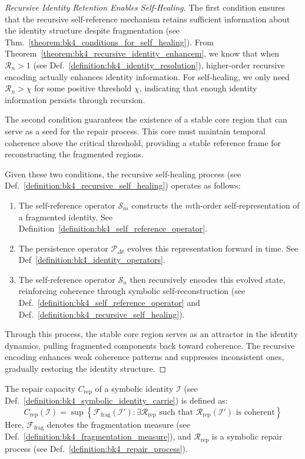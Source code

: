 \begin{proof}[Recursive Identity Retention Enables Self-Healing]
\label{proof:bk4_recursive_self_healing_threshold}
The first condition ensures that the recursive self-reference mechanism retains sufficient information about the identity structure despite fragmentation (see Thm.~\ref{theorem:bk4_conditions_for_self_healing}). From Theorem~\ref{theorem:bk4_recursive_identity_enhancem}, we know that when $\mathcal{R}_n > 1$ (see Def.~\ref{definition:bk4_identity_resolution}), higher-order recursive encoding actually enhances identity information. For self-healing, we only need $\mathcal{R}_n > \chi$ for some positive threshold $\chi$, indicating that enough identity information persists through recursion.

The second condition guarantees the existence of a stable core region that can serve as a seed for the repair process. This core must maintain temporal coherence above the critical threshold, providing a stable reference frame for reconstructing the fragmented regions.

Given these two conditions, the recursive self-healing process (see Def.~\ref{definition:bk4_recursive_self_healing}) operates as follows:
\begin{enumerate}
    \item The self-reference operator \( \mathcal{S}_m \) constructs the \( m \)th-order self-representation of a fragmented identity. See Definition~\ref{definition:bk4_self_reference_operator}.
    \item The persistence operator \( \mathcal{P}_{\Delta t} \) evolves this representation forward in time. See Def~\ref{definition:bk4_identity_operators}.
    \item The self-reference operator \( \mathcal{S}_n \) then recursively encodes this evolved state, reinforcing coherence through symbolic self-reconstruction (see Def.~\ref{definition:bk4_self_reference_operator} and Def.~\ref{definition:bk4_recursive_self_healing}).
\end{enumerate}

Through this process, the stable core region serves as an attractor in the identity dynamics, pulling fragmented components back toward coherence. The recursive encoding enhances weak coherence patterns and suppresses inconsistent ones, gradually restoring the identity structure.
\end{proof}
\begin{definition}
\label{definition:bk4_repair_capacity}
The repair capacity $C_{\text{rep}}$ of a symbolic identity $\mathcal{I}$ (see Def.~\ref{definition:bk4_symbolic_identity_carrie}) is defined as:
\begin{equation}
    C_{\text{rep}}(\mathcal{I}) = \sup \left\{ \mathcal{F}_{\text{frag}}(\mathcal{I}') : \exists \mathcal{R}_{\text{rep}} \text{ such that } \mathcal{R}_{\text{rep}}(\mathcal{I}') \text{ is coherent} \right\}
\end{equation}
Here, $\mathcal{F}_{\text{frag}}$ denotes the fragmentation measure (see Def.~\ref{definition:bk4_fragmentation_measure}), and $\mathcal{R}_{\text{rep}}$ is a symbolic repair process (see Def.~\ref{definition:bk4_repair_process}).
\end{definition}

